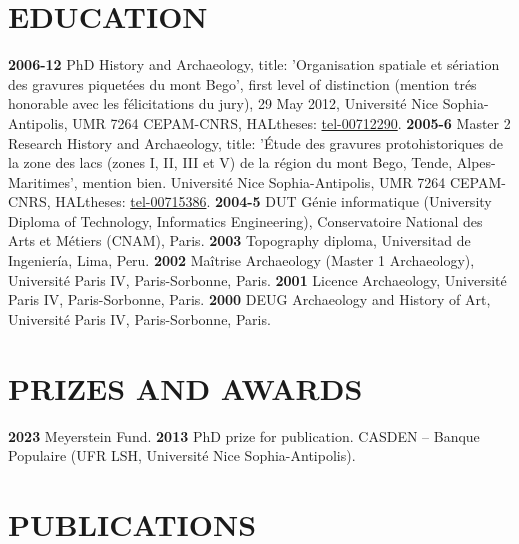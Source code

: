 \documentclass{article}
\begin{document}
\section{EDUCATION}

\textbf{2006-12 }PhD History and Archaeology, title: 'Organisation spatiale et s\'{e}riation des gravures piquet\'{e}es du mont Bego', first level of distinction (mention tr\'{e}s honorable avec les f\'{e}licitations du jury), 29 May 2012, Universit\'{e} Nice Sophia-Antipolis, UMR 7264 CEPAM-CNRS, HALtheses: \href{https://tel.archives-ouvertes.fr/tel-00712290}{tel-00712290}.
\smallbreak
\textbf{2005-6 }Master 2 Research History and Archaeology, title: '\'{E}tude des gravures protohistoriques de la zone des lacs (zones I, II, III et V) de la r\'{e}gion du mont Bego, Tende, Alpes-Maritimes', mention bien. Universit\'{e} Nice Sophia-Antipolis, UMR 7264 CEPAM-CNRS, HALtheses: \href{https://tel.archives-ouvertes.fr/tel-00715386}{tel-00715386}.
\smallbreak
\textbf{2004-5 }DUT G\'{e}nie informatique (University Diploma of Technology, Informatics Engineering), Conservatoire National des Arts et M\'{e}tiers (CNAM), Paris.
\smallbreak
\textbf{2003 } Topography diploma, Universitad de Ingenier\'{i}a, Lima, Peru.
\smallbreak
\textbf{2002 } Maîtrise Archaeology (Master 1 Archaeology), Université Paris IV, Paris-Sorbonne, Paris.
\smallbreak
\textbf{2001 } Licence Archaeology, Université Paris IV, Paris-Sorbonne, Paris.
\smallbreak
\textbf{2000 } DEUG Archaeology and History of Art, Université Paris IV, Paris-Sorbonne, Paris.

\section{PRIZES AND AWARDS}

\textbf{2023 }Meyerstein Fund.
\smallbreak
\textbf{2013 }PhD prize for publication. CASDEN -- Banque Populaire (UFR LSH, Universit\'{e} Nice Sophia-Antipolis).
\smallbreak

\section{PUBLICATIONS}
\end{document}
